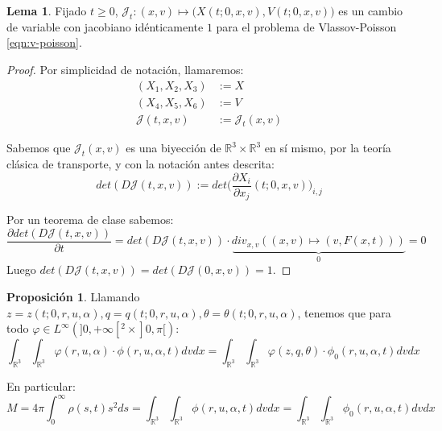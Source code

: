 \documentclass[a4paper,10pt]{scrartcl}
\theoremstyle{definition}
\newtheorem{lemma}{Lema}
\newtheorem{fact}{Proposición}
\numberwithin{equation}{section}
\begin{document}
\begin{lemma}
Fijado $t\ge 0$, $\mathcal{J}_t:(x,v) \mapsto \bigg(X(t;0,x,v), V(t;0,x,v)\bigg)$ es un cambio de variable con jacobiano idénticamente $1$ para el problema de Vlassov-Poisson \eqref{eqn:v-poisson}.
\label{lemma:cv-vp}
\end{lemma}
\begin{proof}
Por simplicidad de notación, llamaremos:
\begin{align*}
(X_1, X_2, X_3) &:= X\\
(X_4, X_5, X_6) &:= V\\
\mathcal{J}(t,x,v) &:= \mathcal{J}_t(x,v)
\end{align*}

Sabemos que $\mathcal{J}_t(x,v)$ es una biyección de $\mathbb{R}^3 \times \mathbb{R}^3$ en sí mismo, por la teoría clásica de transporte, y con la notación antes descrita:
 \[
 det(D\mathcal{J}(t,x,v)) := det\bigg(\frac{\partial{X_i}}{\partial x_j}(t;0,x,v)\bigg)_{i,j}
 \]

 Por un teorema de clase sabemos:
 \[
 \frac{\partial det(D\mathcal{J}(t,x,v))}{\partial t} = det(D\mathcal{J}(t,x,v)) \cdot \underbrace{div_{x,v}((x,v) \mapsto (v,F(x,t)))}_0 = 0
 \]
 Luego $det(D\mathcal{J}(t,x,v)) = det(D\mathcal{J}(0,x,v)) = 1$.
\end{proof}

\begin{fact}
Llamando $z = z(t;0,r,u,\alpha), q = q(t;0,r,u,\alpha), \theta = \theta(t;0,r,u,\alpha)$, tenemos que para todo $\varphi \in L^{\infty}(]0,+\infty[^2 \times ]0,\pi[)$:
\[
    \int_{\mathbb{R}^3}\int_{\mathbb{R}^3} \varphi(r,u,\alpha) \cdot \phi(r,u,\alpha,t) dv dx = 
    \int_{\mathbb{R}^3}\int_{\mathbb{R}^3} \varphi(z,q,\theta) \cdot \phi_0(r,u,\alpha,t) dv dx
\]

En particular:
\[
M = 4\pi \int_0^{\infty} \rho(s,t) s^2 ds = \int_{\mathbb{R}^3} \int_{\mathbb{R}^3} \phi(r,u,\alpha,t) dv dx = \int_{\mathbb{R}^3}\int_{\mathbb{R}^3} \phi_0(r,u,\alpha,t) dv dx
\]
\end{fact}
\end{document}
